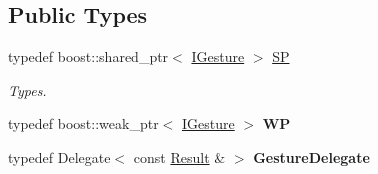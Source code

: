 \subsection*{Public Types}
\begin{DoxyCompactItemize}
\item 
\mbox{\label{class_i_gesture_a4455e468c21c82736bb3ec97c1c72158}} 
typedef boost\+::shared\+\_\+ptr$<$ \hyperlink{class_i_gesture}{I\+Gesture} $>$ \hyperlink{class_i_gesture_a4455e468c21c82736bb3ec97c1c72158}{SP}
\begin{DoxyCompactList}\small\item\em Types. \end{DoxyCompactList}\item 
\mbox{\label{class_i_gesture_a07787d01dffaf1cdf47f2fc977dccf6c}} 
typedef boost\+::weak\+\_\+ptr$<$ \hyperlink{class_i_gesture}{I\+Gesture} $>$ {\bfseries WP}
\item 
\mbox{\label{class_i_gesture_a1dad82fee845b5afba43ed900287f118}} 
typedef Delegate$<$ const \hyperlink{struct_i_gesture_1_1_result}{Result} \& $>$ {\bfseries Gesture\+Delegate}
\end{DoxyCompactItemize}
